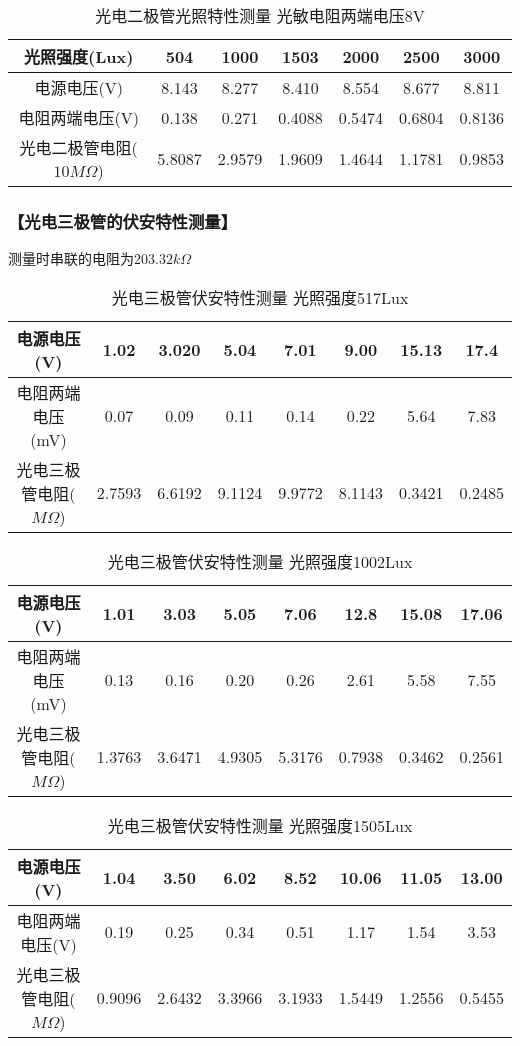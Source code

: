 \documentclass{ctexart}
\let\oldsubsubsection\subsubsection
\renewcommand{\subsubsection}[1]{\oldsubsubsection{\!\!\!\!\!\!【#1】}}
\begin{document}
\begin{table}[H]
  \centering
  \begin{tabular}{|c|c|c|c|c|c|c|}
    \hline
    光照强度(Lux) &504&1000&1503&2000&2500&3000\\\hline
    电源电压(V) &8.143&8.277&8.410&8.554&8.677&8.811\\\hline
    电阻两端电压(V) &0.138&0.271&0.4088&0.5474&0.6804&0.8136\\\hline
    光电二极管电阻($10M\Omega$) & 5.8087&2.9579&1.9609&1.4644&1.1781&0.9853\\\hline
  \end{tabular}
  \caption{光电二极管光照特性测量 光敏电阻两端电压8V}
\end{table}

\subsubsection{光电三极管的伏安特性测量}

测量时串联的电阻为$203.32k\Omega$

\begin{table}[H]
  \centering
  \begin{tabular}{|c|c|c|c|c|c|c|c|}
    \hline
    电源电压(V) &1.02&3.020&5.04&7.01&9.00&15.13&17.4\\\hline
    电阻两端电压(mV) &0.07&0.09&0.11&0.14&0.22&5.64&7.83\\\hline
    光电三极管电阻($M\Omega$) &2.7593&6.6192&9.1124&9.9772&8.1143&0.3421&0.2485 \\\hline
  \end{tabular}
  \caption{光电三极管伏安特性测量 光照强度517Lux}
\end{table}

\begin{table}[H]
  \centering
  \begin{tabular}{|c|c|c|c|c|c|c|c|}
    \hline
    电源电压(V) &1.01&3.03&5.05&7.06&12.8&15.08&17.06\\\hline
    电阻两端电压(mV) &0.13&0.16&0.20&0.26&2.61&5.58&7.55\\\hline
    光电三极管电阻($M\Omega$) & 1.3763&3.6471&4.9305&5.3176&0.7938&0.3462&0.2561\\\hline
  \end{tabular}
  \caption{光电三极管伏安特性测量 光照强度1002Lux}
\end{table}

\begin{table}[H]
  \centering
  \begin{tabular}{|c|c|c|c|c|c|c|c|}
    \hline
    电源电压(V) &1.04&3.50&6.02&8.52&10.06&11.05&13.00\\\hline
    电阻两端电压(V) &0.19&0.25&0.34&0.51&1.17&1.54&3.53\\\hline
    光电三极管电阻($M\Omega$) &0.9096&2.6432&3.3966&3.1933&1.5449&1.2556&0.5455 \\\hline
  \end{tabular}
  \caption{光电三极管伏安特性测量 光照强度1505Lux}
\end{table}
\end{document}
